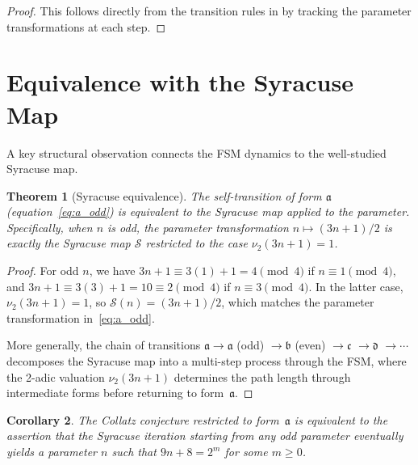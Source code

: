 \documentclass[11pt,a4paper]{article}
\theoremstyle{plain}
\newtheorem{theorem}{Theorem}[section]
\newtheorem{corollary}[theorem]{Corollary}
\theoremstyle{definition}
\newcommand{\Smap}{\mathcal{S}}
\begin{document}
\begin{proof}
  This follows directly from the transition rules in  by tracking the parameter transformations at each step.
\end{proof}

\section{Equivalence with the Syracuse Map}
\label{sec:syracuse}

A key structural observation connects the FSM dynamics to the well-studied Syracuse map.

\begin{theorem}[Syracuse equivalence]\label{thm:syracuse_equivalence}
  The self-transition of form $\mathfrak{a}$ (equation~\eqref{eq:a_odd}) is equivalent to the Syracuse map applied to the parameter. Specifically, when $n$ is odd, the parameter transformation $n \mapsto (3n+1)/2$ is exactly the Syracuse map $\Smap$ restricted to the case $\nu_2(3n+1) = 1$.
\end{theorem}

\begin{proof}
  For odd $n$, we have $3n+1 \equiv 3(1)+1 = 4 \pmod{4}$ if $n \equiv 1 \pmod{4}$, and $3n+1 \equiv 3(3)+1 = 10 \equiv 2 \pmod{4}$ if $n \equiv 3 \pmod{4}$. In the latter case, $\nu_2(3n+1) = 1$, so $\Smap(n) = (3n+1)/2$, which matches the parameter transformation in~\eqref{eq:a_odd}.

  More generally, the chain of transitions $\mathfrak{a} \to \mathfrak{a}$ (odd) $\to \mathfrak{b}$ (even) $\to \mathfrak{c}$ $\to \mathfrak{d}$ $\to \cdots$ decomposes the Syracuse map into a multi-step process through the FSM, where the 2-adic valuation $\nu_2(3n+1)$ determines the path length through intermediate forms before returning to form~$\mathfrak{a}$.
\end{proof}

\begin{corollary}\label{cor:equivalence_depth}
  The Collatz conjecture restricted to form~$\mathfrak{a}$ is equivalent to the assertion that the Syracuse iteration starting from any odd parameter eventually yields a parameter $n$ such that $9n+8 = 2^m$ for some $m \geq 0$.
\end{corollary}
\end{document}
